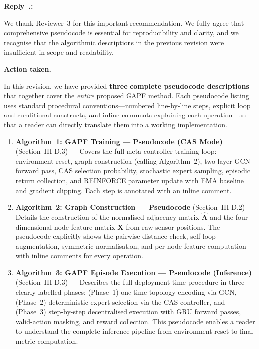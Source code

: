 \documentclass[11pt]{article}
\newcounter{reviewer}
\newcounter{replyctr}[reviewer]
\renewcommand{\thereplyctr}{\thereviewer.\arabic{replyctr}}
\newenvironment{reply}
  {\refstepcounter{replyctr}%
   \addtocounter{replyctr}{-1}%
   \medskip\noindent
   \begin{sf}\textbf{Reply~\thereplyctr:}\ }
  {\addtocounter{replyctr}{1}%
   \medskip\end{sf}}
\begin{document}
\begin{reply}
\begin{mdframed}[style=Resp]
We thank Reviewer~3 for this important recommendation. We fully agree that comprehensive pseudocode is essential for reproducibility and clarity, and we recognise that the algorithmic descriptions in the previous revision were insufficient in scope and readability.

\medskip
\noindent\textbf{Action taken.}

In this revision, we have provided \textbf{three complete pseudocode descriptions} that together cover the \emph{entire} proposed GAPF method. Each pseudocode listing uses standard procedural conventions---numbered line-by-line steps, explicit loop and conditional constructs, and inline comments explaining each operation---so that a reader can directly translate them into a working implementation.

\begin{enumerate}[nosep]
    \item \textbf{Algorithm~1: GAPF Training --- Pseudocode (CAS Mode)} (Section~III-D.3) --- Covers the full meta-controller training loop: environment reset, graph construction (calling Algorithm~2), two-layer GCN forward pass, CAS selection probability, stochastic expert sampling, episodic return collection, and REINFORCE parameter update with EMA baseline and gradient clipping. Each step is annotated with an inline comment.
    
    \item \textbf{Algorithm~2: Graph Construction --- Pseudocode} (Section~III-D.2) --- Details the construction of the normalised adjacency matrix $\hat{\mathbf{A}}$ and the four-dimensional node feature matrix $\mathbf{X}$ from raw sensor positions. The pseudocode explicitly shows the pairwise distance check, self-loop augmentation, symmetric normalisation, and per-node feature computation with inline comments for every operation.
    
    \item \textbf{Algorithm~3: GAPF Episode Execution --- Pseudocode (Inference)} (Section~III-D.3) --- Describes the full deployment-time procedure in three clearly labelled phases: (Phase~1) one-time topology encoding via GCN, (Phase~2) deterministic expert selection via the CAS controller, and (Phase~3) step-by-step decentralised execution with GRU forward passes, valid-action masking, and reward collection. This pseudocode enables a reader to understand the complete inference pipeline from environment reset to final metric computation.
\end{enumerate}


\end{mdframed}
\end{reply}
\end{document}
